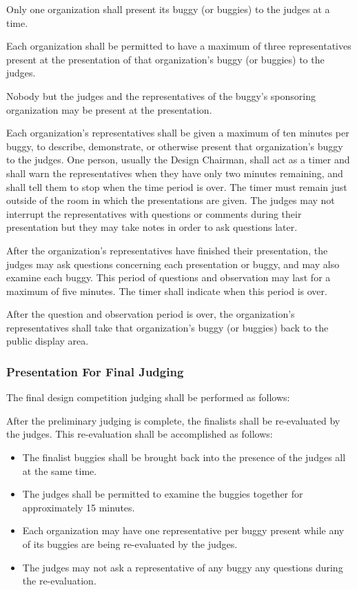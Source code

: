Only one organization shall present its buggy (or buggies) to the judges at a time.

Each organization shall be permitted to have a maximum of three representatives present at the presentation of that organization's buggy (or buggies) to the judges.

Nobody but the judges and the representatives of the buggy's sponsoring organization may be present at the presentation.

Each organization's representatives shall be given a maximum of ten minutes per buggy, to describe, demonstrate, or otherwise present that organization's buggy to the judges. One person, usually the Design Chairman, shall act as a timer and shall warn the representatives when they have only two minutes remaining, and shall tell them to stop when the time period is over. The timer must remain just outside of the room in which the presentations are given. The judges may not interrupt the representatives with questions or comments during their presentation but they may take notes in order to ask questions later.

After the organization's representatives have finished their presentation, the judges may ask questions concerning each presentation or buggy, and may also examine each buggy. This period of questions and observation may last for a maximum of five minutes. The timer shall indicate when this period is over.

After the question and observation period is over, the organization's representatives shall take that organization's buggy (or buggies) back to the public display area.

\subsubsection{Presentation For Final Judging}

The final design competition judging shall be performed as follows:

After the preliminary judging is complete, the finalists shall be re-evaluated by the judges. This re-evaluation shall be accomplished as follows:
	\begin{itemize}
		\item The finalist buggies shall be brought back into the presence of the judges all at the same time.
		\item The judges shall be permitted to examine the buggies together for approximately 15 minutes.
		\item Each organization may have one representative per buggy present while any of its buggies are being re-evaluated by the judges.
		\item The judges may not ask a representative of any buggy any questions during the re-evaluation.
	\end{itemize}


